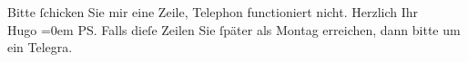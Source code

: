 \begin{ledgroupsized}[t]{13cm}
           Bitte ſchicken Sie mir eine Zeile, Telephon functioniert nicht.\pend
           \pstart
           Herzlich Ihr{\\[\baselineskip]}\spacefill\mbox{Hugo}\pend
           \leftskip=0em{}\pstart
           {\pb}\textsc{PS}. Falls dieſe Zeilen Sie ſpäter als Montag erreichen,
               dann bitte um ein Telegra{\geminationm}.\pend
           \endnumbering{}\end{ledgroupsized}  \newcommand{\dateiname}{L02347}\newcommand{\titel}{Hugo Hofmannsthal an Arthur Schnitzler, 10. 7. 1920}\newcommand{\editorInnen}{Martin Anton Müller und Gerd-Hermann Susen}
      